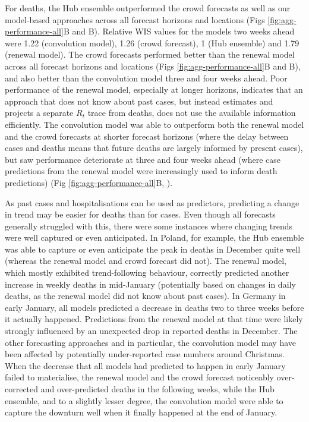 \documentclass[10pt,letterpaper]{article}
\begin{document}
For deaths, the Hub ensemble outperformed the crowd forecasts as well as
our model-based approaches across all forecast horizons and locations
(Figs \ref{fig:agg-performance-all}B and
B). Relative WIS values for the
models two weeks ahead were 1.22 (convolution model), 1.26 (crowd
forecast), 1 (Hub ensemble) and 1.79 (renewal model). The crowd
forecasts performed better than the renewal model across all forecast
horizons and locations (Figs \ref{fig:agg-performance-all}B and
B), and also better than the
convolution model three and four weeks ahead. Poor performance of the
renewal model, especially at longer horizons, indicates that an approach
that does not know about past cases, but instead estimates and projects
a separate \(R_t\) trace from deaths, does not use the available
information efficiently. The convolution model was able to outperform
both the renewal model and the crowd forecasts at shorter forecast
horizons (where the delay between cases and deaths means that future
deaths are largely informed by present cases), but saw performance
deteriorate at three and four weeks ahead (where case predictions from
the renewal model were increasingly used to inform death predictions)
(Fig \ref{fig:agg-performance-all}B, ).

As past cases and hospitalisations can be used as predictors, predicting
a change in trend may be easier for deaths than for cases. Even though
all forecasts generally struggled with this, there were some instances
where changing trends were well captured or even anticipated. In Poland,
for example, the Hub ensemble was able to capture or even anticipate the
peak in deaths in December quite well (whereas the renewal model and
crowd forecast did not). The renewal model, which mostly exhibited
trend-following behaviour, correctly predicted another increase in
weekly deaths in mid-January (potentially based on changes in daily
deaths, as the renewal model did not know about past cases). In Germany
in early January, all models predicted a decrease in deaths two to three
weeks before it actually happened. Predictions from the renewal model at
that time were likely strongly influenced by an unexpected drop in
reported deaths in December. The other forecasting approaches and in
particular, the convolution model may have been affected by potentially
under-reported case numbers around Christmas. When the decrease that all
models had predicted to happen in early January failed to materialise,
the renewal model and the crowd forecast noticeably over-corrected and
over-predicted deaths in the following weeks, while the Hub ensemble,
and to a slightly lesser degree, the convolution model were able to
capture the downturn well when it finally happened at the end of
January.
\end{document}
